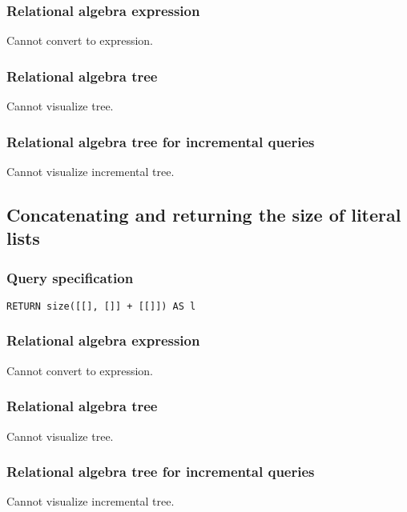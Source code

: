 \subsubsection*{Relational algebra expression}

Cannot convert to expression.

\subsubsection*{Relational algebra tree}

Cannot visualize tree.

\subsubsection*{Relational algebra tree for incremental queries}

Cannot visualize incremental tree.

\subsection{Concatenating and returning the size of literal lists}

\subsubsection*{Query specification}

\begin{lstlisting}
RETURN size([[], []] + [[]]) AS l
\end{lstlisting}

\subsubsection*{Relational algebra expression}

Cannot convert to expression.

\subsubsection*{Relational algebra tree}

Cannot visualize tree.

\subsubsection*{Relational algebra tree for incremental queries}

Cannot visualize incremental tree.

